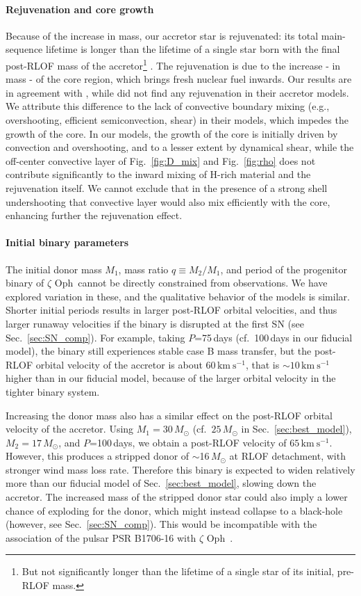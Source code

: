 \documentclass[twocolumn,twocolappendix,trackchanges]{aastex63}
\newcommand{\kms}{{\mathrm{km\ s^{-1}}}}
\DeclareRobustCommand{\Figref}[1]{Fig.~\ref{#1}}
\DeclareRobustCommand{\Secref}[1]{Sec.~\ref{#1}}
\newcommand{\zoph}{$\zeta$ Oph}
\begin{document}
\paragraph{Rejuvenation and core growth}
Because of the increase in mass, our accretor star is rejuvenated: its
total main-sequence lifetime is longer than the lifetime of a single
star born with the final post-RLOF mass of the accretor\footnote{But
  not significantly longer than the lifetime of a single star of its
  initial, pre-RLOF mass.}  \citep[e.g.,][]{schneider:16}. The
rejuvenation is due to the increase - in mass - of the core region,
which brings fresh nuclear fuel inwards. Our results are in agreement
with \cite{hellings:83}, while \cite{braun:95} did not find any
rejuvenation in their accretor models. We attribute this difference to
the lack of convective boundary mixing (e.g., overshooting, efficient
semiconvection, shear) in their models, which impedes the growth of
the core. In our models, the growth of the core is initially driven by
convection and overshooting, and to a lesser extent by dynamical
shear, while the off-center convective layer of \Figref{fig:D_mix} and
\Figref{fig:rho} does not contribute significantly to the inward
mixing of H-rich material and the rejuvenation itself. We cannot
exclude that in the presence of a strong shell undershooting that
convective layer would also mix efficiently with the core, enhancing
further the rejuvenation effect.

\paragraph{Initial binary parameters}
The initial donor mass $M_1$, mass ratio $q\equiv M_2/M_1$, and
period of the progenitor binary of \zoph\ cannot be directly
constrained from observations. We have explored variation in these,
and the qualitative behavior of the models is similar.  Shorter
initial periods results in larger post-RLOF orbital velocities, and
thus larger runaway velocities if the binary is disrupted at the first
SN (see \Secref{sec:SN_comp}). For example, taking $P$=75\,days (cf.\
100\,days in our fiducial model), the binary still experiences stable
case B mass transfer, but the post-RLOF orbital velocity of the
accretor is about $60\,\kms$, that is $\sim{}10\,\kms$ higher than in
our fiducial model, because of the larger orbital velocity in the
tighter binary system.

Increasing the donor mass also has a similar effect on the post-RLOF
orbital velocity of the accretor. Using $M_1=30\,M_\odot$ (cf.\
$25\,M_\odot$ in \Secref{sec:best_model}), $M_2=17\,M_\odot$, and
$P$=100\,days, we obtain a post-RLOF velocity of $65\,\kms$. However,
this produces a stripped donor of $\sim$16\,$M_\odot$ at RLOF
detachment, with stronger wind mass loss rate. Therefore this binary
is expected to widen relatively more than our fiducial model of
\Secref{sec:best_model}, slowing down the accretor. The increased mass
of the stripped donor star could also imply a lower chance of
exploding for the donor, which might instead collapse to a black-hole
(however, see \Secref{sec:SN_comp}). This would be incompatible with
the association of the pulsar PSR B1706-16 with \zoph\ \citep{neuhauser:20}.
\end{document}

